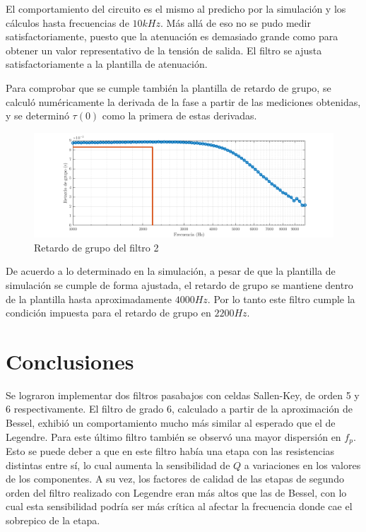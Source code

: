 \documentclass[../../tc_tp5_main.tex]{subfiles}
\begin{document}
El comportamiento del circuito es el mismo al predicho por la simulaci\'on y los c\'alculos hasta frecuencias de $10kHz$. M\'as all\'a de eso no se pudo medir satisfactoriamente, puesto que la atenuaci\'on es demasiado grande como para obtener un valor representativo de la tensi\'on de salida. El filtro se ajusta satisfactoriamente a la plantilla de atenuaci\'on.\par

Para comprobar que se cumple tambi\'en la plantilla de retardo de grupo, se calcul\'o num\'ericamente la derivada de la fase a partir de las mediciones obtenidas, y se determin\'o $\tau(0)$ como la primera de estas derivadas. 

\begin{figure}[H]
	\centering
	\includegraphics[scale=0.7]{imagenes/tc_tp5_ej1_gd.png}
	\caption{Retardo de grupo del filtro 2}
\end{figure}

De acuerdo a lo determinado en la simulaci\'on, a pesar de que la plantilla de simulaci\'on se cumple de forma ajustada, el retardo de grupo se mantiene dentro de la plantilla hasta aproximadamente $4000Hz$. Por lo tanto este filtro cumple la condici\'on impuesta para el retardo de grupo en $2200Hz$.

\section{Conclusiones}

Se lograron implementar dos filtros pasabajos con celdas Sallen-Key, de orden 5 y 6 respectivamente. El filtro de grado 6, calculado a partir de la aproximaci\'on de Bessel, exhibi\'o un comportamiento mucho m\'as similar al esperado que el de Legendre. Para este \'ultimo filtro tambi\'en se observ\'o una mayor dispersi\'on en $f_p$. Esto se puede deber a que en este filtro hab\'ia una etapa con las resistencias distintas entre s\'i, lo cual aumenta la sensibilidad de $Q$ a variaciones en los valores de los componentes. A su vez, los factores de calidad de las etapas de segundo orden del filtro realizado con Legendre eran m\'as altos que las de Bessel, con lo cual esta sensibilidad podr\'ia ser m\'as cr\'itica al afectar la frecuencia donde cae el sobrepico de la etapa. \par
\end{document}
